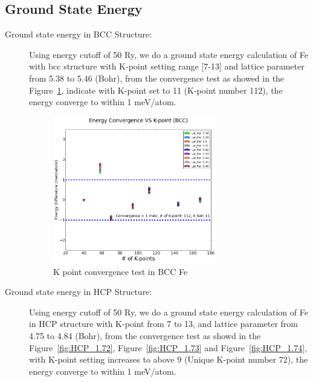 \documentclass{article}
\begin{document}
\subsection{Ground State Energy}
\begin{description}
\item[Ground state energy in BCC Structure:]
Using energy cutoff of 50 Ry, we do a ground state energy calculation of Fe with bcc structure with K-point setting range [7-13] and lattice parameter from 5.38 to 5.46 (Bohr), 
from the convergence test as showed in the Figure~\ref{fig:BCC_K_point_test}, indicate with K-point set to 11 (K-point number 112), the energy converge to within 1 meV/atom. 

\begin{figure}[h!]
\centering
\includegraphics[width=0.7\textwidth]{Q1_BCC_K_Points_test.png}
\caption{K point convergence test in BCC Fe}
\label{fig:BCC_K_point_test}
\end{figure} 

\item[Ground state energy in HCP Structure:]
Using energy cutoff of 50 Ry, we do a ground state energy calculation of Fe in HCP structure with K-point from 7 to 13, and lattice parameter from 4.75 to 4.84 (Bohr), from 
the convergence test as showd in the Figure~\ref{fig:HCP_1.72}, Figure~\ref{fig:HCP_1.73} and Figure~\ref{fig:HCP_1.74}, with K-point setting increases to above 9 (Unique K-point
number 72), the energy converge to within 1 meV/atom. 


\end{description}
\end{document}
